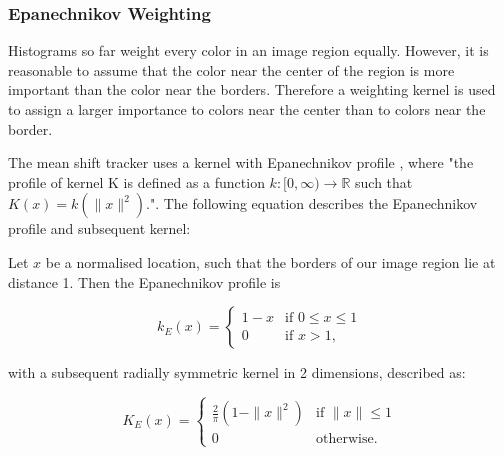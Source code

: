 \documentclass[a4paper,11pt]{article}
\begin{document}
\subsubsection{Epanechnikov Weighting}

Histograms so far weight every color in an image region equally. However, it is reasonable to assume that the color near the center of the region is more important than the color near the borders. Therefore a weighting kernel is used to assign a larger importance to colors near the center than to colors near the border.



The mean shift tracker uses a kernel with Epanechnikov profile \cite{mean_shift_epan}, where "the profile of kernel K is defined as a function $k:[0,\infty)\rightarrow\mathbb{R}$ such that $K(x)=k(\|x\|^2)$."\cite{mean_shift}. The following equation describes the Epanechnikov profile and subsequent kernel: 



Let $x$ be a normalised location, such that the borders of our image region lie at distance 1. Then the Epanechnikov profile is



\begin{equation}

\label{eq:epanechnikov_profile}

k_E(x) = \left\{ \begin{array}{cl}

  1-x & \textrm{if } 0 \leq x \leq 1\\

  0 & \textrm{if }  x > 1 ,\end{array}\right.

\end{equation}

with a subsequent radially symmetric kernel in 2 dimensions, described as:

\begin{equation}

\label{eq:epanechnikov_kernel1}

K_E(x) = \left\{ \begin{array}{cl}

  \frac{2}{\pi} (1-\|x\|^2) & \textrm{if } \|x\| \leq 1 \\

  0 & \textrm{otherwise.} \end{array}\right.

\end{equation}
\end{document}
